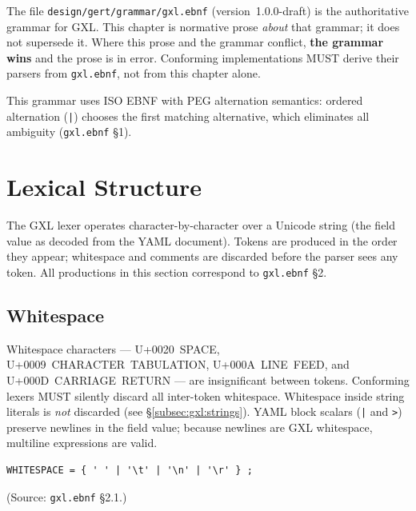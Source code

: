 The file \texttt{design/gert/grammar/gxl.ebnf} (version~1.0.0-draft) is the
authoritative grammar for GXL.  This chapter is normative prose \emph{about}
that grammar; it does not supersede it.  Where this prose and the grammar
conflict, \textbf{the grammar wins} and the prose is in error.  Conforming
implementations MUST derive their parsers from \texttt{gxl.ebnf}, not from
this chapter alone.

This grammar uses ISO EBNF with PEG alternation semantics:
ordered alternation (\texttt{|}) chooses the first matching alternative,
which eliminates all ambiguity
(\texttt{gxl.ebnf} \S1).

\section{Lexical Structure}
\label{sec:gxl:lexical}

The GXL lexer operates character-by-character over a Unicode string
(the field value as decoded from the YAML document).
Tokens are produced in the order they appear;
whitespace and comments are discarded before the parser sees any token.
All productions in this section correspond to \texttt{gxl.ebnf} \S2.

\subsection{Whitespace}
\label{subsec:gxl:whitespace}

Whitespace characters --- U+0020~SPACE, U+0009~CHARACTER~TABULATION,
U+000A~LINE~FEED, and U+000D~CARRIAGE~RETURN --- are insignificant between
tokens.
Conforming lexers MUST silently discard all inter-token whitespace.
Whitespace inside string literals is \emph{not} discarded (see
\S\ref{subsec:gxl:strings}).
YAML block scalars (\texttt{|} and \texttt{>}) preserve newlines in the field
value; because newlines are GXL whitespace, multiline expressions are valid.

\begin{verbatim}
WHITESPACE = { ' ' | '\t' | '\n' | '\r' } ;
\end{verbatim}

(Source: \texttt{gxl.ebnf} \S2.1.)

